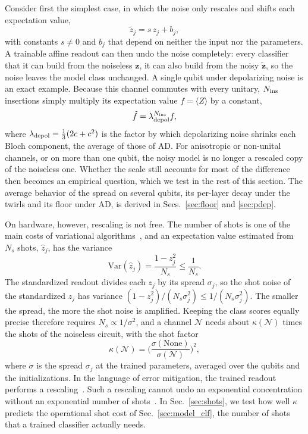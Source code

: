 \documentclass[
 aps,pra,
 twocolumn,
 superscriptaddress,
 longbibliography,
 nofootinbib
]{revtex4-2}
\begin{document}
Consider first the simplest case, in which the noise only rescales and shifts
each expectation value,
\begin{equation}
\tilde z_j=s\,z_j+b_j ,
\label{eq:affine}
\end{equation}
with constants $s\neq0$ and $b_j$ that depend on neither the input nor the
parameters. A trainable affine readout can then undo the noise completely:
every classifier that it can build from the noiseless $\mathbf z$, it
can also build from the noisy $\tilde{\mathbf z}$, so the noise leaves
the model class unchanged. A single qubit under depolarizing noise is an exact
example. Because this channel commutes with every unitary, $N_{\rm ins}$
insertions simply multiply its expectation value $f=\langle Z\rangle$ by a
constant,
\begin{equation}
\tilde f=\lambda_{\rm depol}^{N_{\rm ins}}f ,
\label{eq:depol_scale}
\end{equation}
where $\lambda_{\rm depol}=\frac13(2c+c^2)$ is the factor by which depolarizing
noise shrinks each Bloch component, the average of those of AD.
For anisotropic or non-unital channels, or on more than one qubit, the noisy
model is no longer a rescaled copy of the noiseless one. Whether the scale
still accounts for most of the difference then becomes an empirical question,
which we test in the rest of this section. The average behavior of the spread
on several qubits, its per-layer decay under the twirls and its floor under
AD, is derived in Secs.~\ref{sec:floor} and \ref{sec:pdep}.

On hardware, however, rescaling is not free. The number of shots is one of the
main costs of variational algorithms~\cite{wecker2015progress,gonthier2022measurements},
and an expectation value estimated from $N_s$ shots, $\hat z_j$, has the variance
\begin{equation}
\mathrm{Var}(\hat z_j)=\frac{1-z_j^2}{N_s}\le\frac1{N_s} .
\label{eq:shotvar}
\end{equation}
The standardized readout divides each $z_j$ by its spread $\sigma_j$, so the
shot noise of the standardized $z_j$ has variance
$(1-z_j^2)/(N_s\sigma_j^2)\le1/(N_s\sigma_j^2)$. The smaller the spread, the more
the shot noise is amplified. Keeping the class scores equally precise therefore
requires $N_s\propto1/\sigma^2$, and a channel $\mathcal N$ needs about
$\kappa(\mathcal N)$ times the shots of the noiseless circuit, with the shot
factor
\begin{equation}
\kappa(\mathcal N)=\biggl(\frac{\sigma(\text{None})}{\sigma(\mathcal N)}\biggr)^{2},
\label{eq:kappa}
\end{equation}
where $\sigma$ is the spread $\sigma_j$ at the trained parameters, averaged over
the qubits and the initializations.
In the language of error
mitigation, the trained readout performs a
rescaling~\cite{vovrosh2021simple,urbanek2021mitigating}. Such a rescaling
cannot undo an exponential concentration without an exponential number of
shots~\cite{wang2024errormitigation}. In Sec.~\ref{sec:shots}, we test how well
$\kappa$ predicts the operational shot cost of Sec.~\ref{sec:model_clf}, the
number of shots that a trained classifier actually needs.
\end{document}
